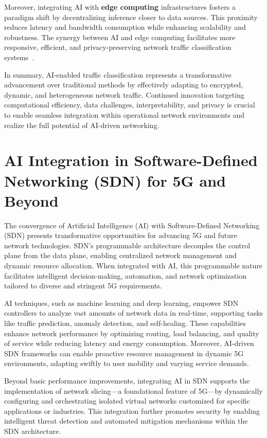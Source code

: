 \documentclass[sigconf]{acmart}
\begin{document}
Moreover, integrating AI with \textbf{edge computing} infrastructures fosters a paradigm shift by decentralizing inference closer to data sources. This proximity reduces latency and bandwidth consumption while enhancing scalability and robustness. The synergy between AI and edge computing facilitates more responsive, efficient, and privacy-preserving network traffic classification systems~\cite{ref49,ref51}.

In summary, AI-enabled traffic classification represents a transformative advancement over traditional methods by effectively adapting to encrypted, dynamic, and heterogeneous network traffic. Continued innovation targeting computational efficiency, data challenges, interpretability, and privacy is crucial to enable seamless integration within operational network environments and realize the full potential of AI-driven networking.

\section{AI Integration in Software-Defined Networking (SDN) for 5G and Beyond}

The convergence of Artificial Intelligence (AI) with Software-Defined Networking (SDN) presents transformative opportunities for advancing 5G and future network technologies. SDN’s programmable architecture decouples the control plane from the data plane, enabling centralized network management and dynamic resource allocation. When integrated with AI, this programmable nature facilitates intelligent decision-making, automation, and network optimization tailored to diverse and stringent 5G requirements.

AI techniques, such as machine learning and deep learning, empower SDN controllers to analyze vast amounts of network data in real-time, supporting tasks like traffic prediction, anomaly detection, and self-healing. These capabilities enhance network performance by optimizing routing, load balancing, and quality of service while reducing latency and energy consumption. Moreover, AI-driven SDN frameworks can enable proactive resource management in dynamic 5G environments, adapting swiftly to user mobility and varying service demands.

Beyond basic performance improvements, integrating AI in SDN supports the implementation of network slicing—a foundational feature of 5G—by dynamically configuring and orchestrating isolated virtual networks customized for specific applications or industries. This integration further promotes security by enabling intelligent threat detection and automated mitigation mechanisms within the SDN architecture.
\end{document}
